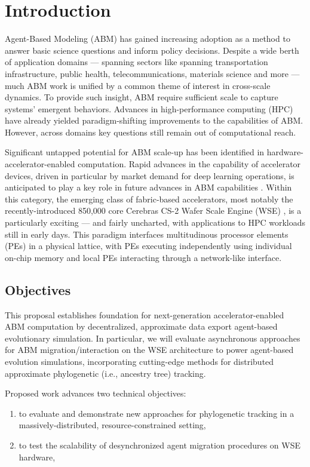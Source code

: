 \section{Introduction} \label{sec:introduction}

Agent-Based Modeling (ABM) has gained increasing adoption as a method to answer basic science questions and inform policy decisions.
Despite a wide berth of application domains --- spanning sectors like spanning transportation infrastructure, public health, telecommunications, materials science and more --- much ABM work is unified by a common theme of interest in cross-scale dynamics.
To provide such insight, ABM require sufficient scale to capture systems' emergent behaviors.
Advances in high-performance computing (HPC) have already yielded paradigm-shifting improvements to the capabilities of ABM.
However, across domains key questions still remain out of computational reach.

Significant untapped potential for ABM scale-up has been identified in hardware-accelerator-enabled computation.
Rapid advances in the capability of accelerator devices, driven in particular by market demand for deep learning operations, is anticipated to play a key role in future advances in ABM capabilities \citep{perumalla2022computer}.
Within this category, the emerging class of fabric-based accelerators, most notably the recently-introduced 850,000 core Cerebras CS-2 Wafer Scale Engine (WSE) \citep{lauterbach2021path,lie2022cerebras}, is a particularly exciting --- and fairly uncharted, with applications to HPC workloads still in early days.
This paradigm interfaces multitudinous processor elements (PEs) in a physical lattice, with PEs executing independently using individual on-chip memory and local PEs interacting through a network-like interface.

\subsection{Objectives}

This proposal establishes foundation for next-generation accelerator-enabled ABM computation by decentralized, approximate data export agent-based evolutionary simulation.
In particular, we will evaluate asynchronous approaches for ABM migration/interaction on the WSE architecture to power agent-based evolution simulations, incorporating cutting-edge methods for distributed approximate phylogenetic (i.e., ancestry tree) tracking.

Proposed work advances two technical objectives:
\begin{enumerate}
\item to evaluate and demonstrate new approaches for phylogenetic tracking in a massively-distributed, resource-constrained setting,
\item to test the scalability of desynchronized agent migration procedures on WSE hardware,
\end{enumerate}

